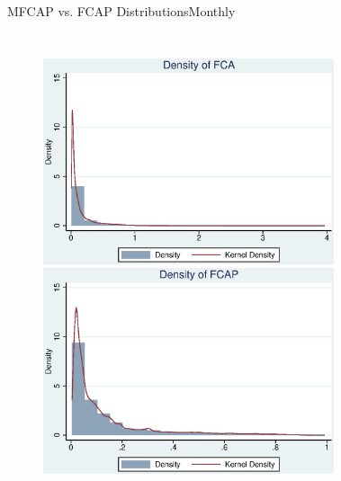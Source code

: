 \documentclass{beamer}
\begin{document}
			
			\begin{frame}{MFCAP vs. FCAP Distributions}{Monthly}
				\label{Monthly1}
				\begin{columns}
					\begin{figure}
						\centering  
						\includegraphics[width=\linewidth]{"MHistFCA.eps"}\\
						\includegraphics[width=\linewidth]{"MHistFCAP.eps"}
					\end{figure}  
				\pause   
					\begin{figure}
						\centering  

\end{figure}
\end{columns}
\end{frame}
\end{document}
